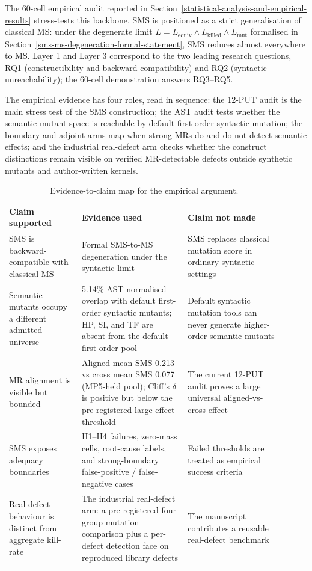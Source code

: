 \documentclass[manuscript,screen,review]{acmart}
\begin{document}
The 60-cell empirical audit reported in Section~\ref{statistical-analysis-and-empirical-results} stress-tests this
backbone. SMS is positioned as a strict generalisation of classical MS:
under the
degenerate limit $L = L_{\mathrm{equiv}} \wedge L_{\mathrm{killed}} \wedge L_{\mathrm{mut}}$
formalised in Section~\ref{sms-ms-degeneration-formal-statement}, SMS reduces almost everywhere to MS. Layer 1 and
Layer 3 correspond to the two leading research questions, RQ1
(constructibility and backward compatibility) and RQ2 (syntactic
unreachability); the 60-cell demonstration answers RQ3--RQ5.

The empirical evidence has four roles, read in sequence: the 12-PUT audit is the
main stress test of the SMS construction; the AST audit tests whether the
semantic-mutant space is reachable by default first-order syntactic mutation;
the boundary and adjoint arms map when strong MRs do and do not detect semantic
effects; and the industrial real-defect arm checks whether the construct
distinctions remain visible on verified MR-detectable defects outside synthetic
mutants and author-written kernels.

\begin{table}[t]
\caption{Evidence-to-claim map for the empirical argument.}
\label{tab:claim-evidence-map}
\centering
\small
\begin{tabular}{p{0.24\linewidth}p{0.35\linewidth}p{0.33\linewidth}}
\toprule
Claim supported & Evidence used & Claim not made \\
\midrule
SMS is backward-compatible with classical MS & Formal SMS-to-MS
degeneration under the syntactic limit & SMS replaces classical mutation
score in ordinary syntactic settings \\
Semantic mutants occupy a different admitted universe & 5.14\%
AST-normalised overlap with default first-order syntactic mutants;
HP, SI, and TF are absent from the default first-order pool & Default
syntactic mutation tools can never generate higher-order semantic
mutants \\
MR alignment is visible but bounded & Aligned mean SMS 0.213 vs
cross mean SMS 0.077 (MP5-held pool); Cliff's \(\delta\) is positive but below the
pre-registered large-effect threshold & The current 12-PUT audit proves
a large universal aligned-vs-cross effect \\
SMS exposes adequacy boundaries & H1--H4 failures, zero-mass cells,
root-cause labels, and strong-boundary false-positive / false-negative
cases & Failed thresholds are treated as empirical success criteria \\
Real-defect behaviour is distinct from aggregate kill-rate & The
industrial real-defect arm: a pre-registered four-group mutation
comparison plus a per-defect detection face on reproduced library
defects & The manuscript contributes a reusable
real-defect benchmark \\
\bottomrule
\end{tabular}
\normalsize
\end{table}
\end{document}
